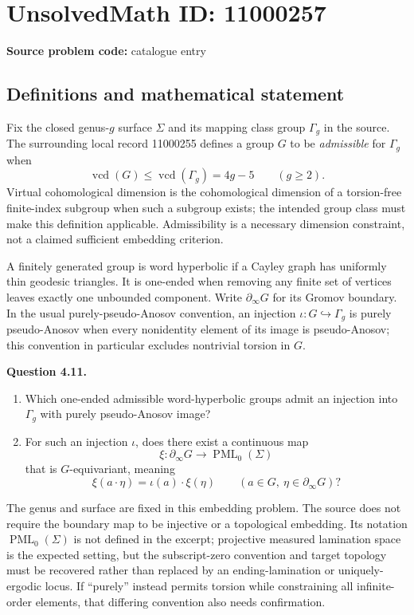 \documentclass[11pt]{article}
\begin{document}
\section*{UnsolvedMath ID: 11000257}
\textbf{Source problem code:} catalogue entry
\subsection{Definitions and mathematical statement}
Fix the closed genus-$g$ surface $\Sigma$ and its mapping class group $\Gamma_g$ in the source. The surrounding local record 11000255 defines a group $G$ to be \emph{admissible} for $\Gamma_g$ when
\[
 \operatorname{vcd}(G)\le\operatorname{vcd}(\Gamma_g)=4g-5\qquad(g\ge2).
\]
Virtual cohomological dimension is the cohomological dimension of a torsion-free finite-index subgroup when such a subgroup exists; the intended group class must make this definition applicable. Admissibility is a necessary dimension constraint, not a claimed sufficient embedding criterion.

A finitely generated group is word hyperbolic if a Cayley graph has uniformly thin geodesic triangles. It is one-ended when removing any finite set of vertices leaves exactly one unbounded component. Write $\partial_\infty G$ for its Gromov boundary. In the usual purely-pseudo-Anosov convention, an injection $\iota:G\hookrightarrow\Gamma_g$ is purely pseudo-Anosov when every nonidentity element of its image is pseudo-Anosov; this convention in particular excludes nontrivial torsion in $G$.

\textbf{Question 4.11.}
\begin{enumerate}
\item Which one-ended admissible word-hyperbolic groups admit an injection into $\Gamma_g$ with purely pseudo-Anosov image?
\item For such an injection $\iota$, does there exist a continuous map
\[
 \xi:\partial_\infty G\longrightarrow\operatorname{PML}_0(\Sigma)
\]
that is $G$-equivariant, meaning
\[
 \xi(a\cdot\eta)=\iota(a)\cdot\xi(\eta)
 \qquad(a\in G,\ \eta\in\partial_\infty G)?
\]
\end{enumerate}
The genus and surface are fixed in this embedding problem. The source does not require the boundary map to be injective or a topological embedding. Its notation $\operatorname{PML}_0(\Sigma)$ is not defined in the excerpt; projective measured lamination space is the expected setting, but the subscript-zero convention and target topology must be recovered rather than replaced by an ending-lamination or uniquely-ergodic locus. If ``purely'' instead permits torsion while constraining all infinite-order elements, that differing convention also needs confirmation.
\end{document}
